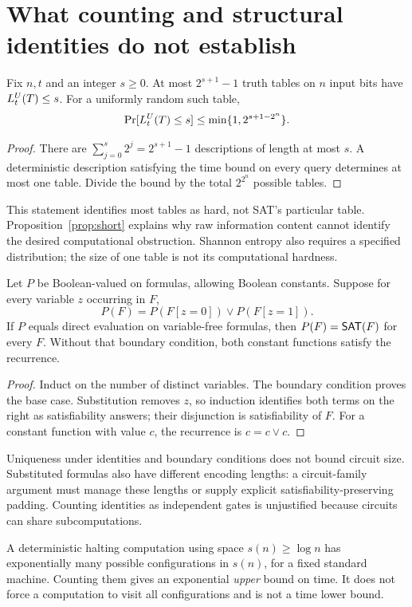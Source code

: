 \section{What counting and structural identities do not establish}
\begin{lemma}
\label{lem:count}
Fix \(n,t\) and an integer \(s\geq0\). At most \(2^{s+1}-1\)
truth tables on \(n\) input bits have \(L^{U}_t(T)\leq s\).
For a uniformly random such table,
\[
 \Pr[L^{U}_t(T)\leq s]\leq\min\{1,2^{s+1-2^n}\}.
\]
\end{lemma}
\begin{proof}
There are \(\sum_{j=0}^s2^j=2^{s+1}-1\) descriptions of length at
most \(s\). A deterministic description satisfying the time bound
on every query determines at most one table. Divide the bound by
the total \(2^{2^n}\) possible tables.
\end{proof}
This statement identifies most tables as hard, not SAT's particular
table. Proposition~\ref{prop:short} explains why raw information content
cannot identify the desired computational obstruction. Shannon entropy
also requires a specified distribution; the size of one table is not
its computational hardness.

\begin{proposition}
\label{prop:boundary}
Let \(P\) be Boolean-valued on formulas, allowing Boolean constants.
Suppose for every variable \(z\) occurring in \(F\),
\[
 P(F)=P(F[z=0])\lor P(F[z=1]).
\]
If \(P\) equals direct evaluation on variable-free formulas, then
\(P(F)=\mathsf{SAT}(F)\) for every \(F\). Without that boundary condition,
both constant functions satisfy the recurrence.
\end{proposition}
\begin{proof}
Induct on the number of distinct variables. The boundary condition
proves the base case. Substitution removes \(z\), so induction
identifies both terms on the right as satisfiability answers; their
disjunction is satisfiability of \(F\). For a constant function with
value \(c\), the recurrence is \(c=c\lor c\).
\end{proof}
Uniqueness under identities and boundary conditions does not bound
circuit size. Substituted formulas also have different encoding
lengths: a circuit-family argument must manage these lengths or
supply explicit satisfiability-preserving padding.
Counting identities as independent gates is unjustified because
circuits can share subcomputations.

A deterministic halting computation using space \(s(n)\geq\log n\)
has exponentially many possible configurations in \(s(n)\), for a
fixed standard machine. Counting them gives an exponential
\emph{upper} bound on time. It does not force a computation to visit
all configurations and is not a time lower bound.
